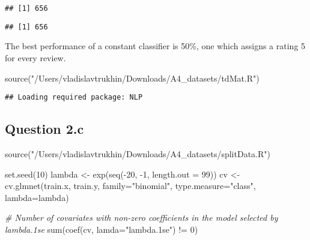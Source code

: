 \documentclass[
]{article}
\newenvironment{Shaded}{\begin{snugshade}}{\end{snugshade}}
\newcommand{\AttributeTok}[1]{\textcolor[rgb]{0.77,0.63,0.00}{#1}}
\newcommand{\CommentTok}[1]{\textcolor[rgb]{0.56,0.35,0.01}{\textit{#1}}}
\newcommand{\DecValTok}[1]{\textcolor[rgb]{0.00,0.00,0.81}{#1}}
\newcommand{\FunctionTok}[1]{\textcolor[rgb]{0.00,0.00,0.00}{#1}}
\newcommand{\NormalTok}[1]{#1}
\newcommand{\OtherTok}[1]{\textcolor[rgb]{0.56,0.35,0.01}{#1}}
\newcommand{\SpecialCharTok}[1]{\textcolor[rgb]{0.00,0.00,0.00}{#1}}
\newcommand{\StringTok}[1]{\textcolor[rgb]{0.31,0.60,0.02}{#1}}
\begin{document}
\begin{verbatim}
## [1] 656
\end{verbatim}

\begin{Shaded}
\end{Shaded}

\begin{verbatim}
## [1] 656
\end{verbatim}

The best performance of a constant classifier is 50\%, one which assigns
a rating 5 for every review.

\begin{Shaded}
\begin{Highlighting}[]
\FunctionTok{source}\NormalTok{(}\StringTok{"/Users/vladislavtrukhin/Downloads/A4\_datasets/tdMat.R"}\NormalTok{)}
\end{Highlighting}
\end{Shaded}

\begin{verbatim}
## Loading required package: NLP
\end{verbatim}

\hypertarget{question-2.c}{%
\subsection{Question 2.c}\label{question-2.c}}

\begin{Shaded}
\begin{Highlighting}[]
\FunctionTok{source}\NormalTok{(}\StringTok{"/Users/vladislavtrukhin/Downloads/A4\_datasets/splitData.R"}\NormalTok{)}
\end{Highlighting}
\end{Shaded}

\begin{Shaded}
\begin{Highlighting}[]
\FunctionTok{set.seed}\NormalTok{(}\DecValTok{10}\NormalTok{)}
\NormalTok{lambda }\OtherTok{\textless{}{-}} \FunctionTok{exp}\NormalTok{(}\FunctionTok{seq}\NormalTok{(}\SpecialCharTok{{-}}\DecValTok{20}\NormalTok{, }\SpecialCharTok{{-}}\DecValTok{1}\NormalTok{, }\AttributeTok{length.out =} \DecValTok{99}\NormalTok{))}
\NormalTok{cv }\OtherTok{\textless{}{-}} \FunctionTok{cv.glmnet}\NormalTok{(train.x, train.y, }\AttributeTok{family=}\StringTok{"binomial"}\NormalTok{, }\AttributeTok{type.measure=}\StringTok{"class"}\NormalTok{, }\AttributeTok{lambda=}\NormalTok{lambda)}

\CommentTok{\# Number of covariates with non{-}zero coefficients in the model selected by lambda.1se}
\FunctionTok{sum}\NormalTok{(}\FunctionTok{coef}\NormalTok{(cv, }\AttributeTok{lamda=}\StringTok{"lambda.1se"}\NormalTok{) }\SpecialCharTok{!=} \DecValTok{0}\NormalTok{)}
\end{Highlighting}
\end{Shaded}
\end{document}
